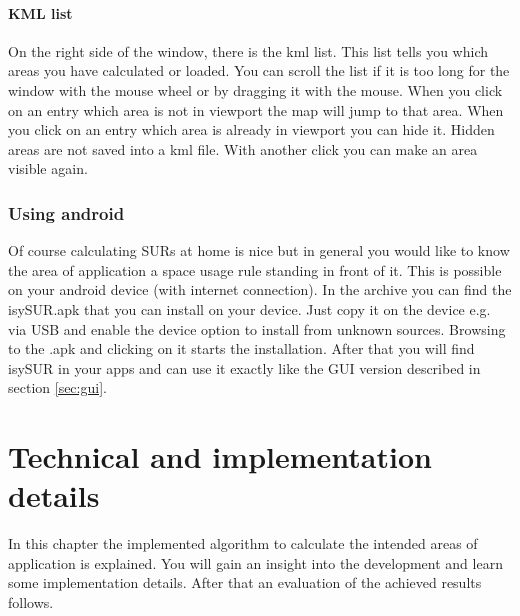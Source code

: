 \documentclass[11pt,fleqn]{book} %
\begin{document}
\subsubsection{KML list}
On the right side of the window, there is the kml list. This list tells you which areas you have calculated or loaded. You can scroll the list if it is too long for the window with the mouse wheel or by dragging it with the mouse. When you click on an entry which area is not in viewport the map will jump to that area. When you click on an entry which area is already in viewport you can hide it. Hidden areas are not saved into a kml file. With another click you can make an area visible again. %

\subsection{Using android}\label{sec:android}
Of course calculating SURs at home is nice but in general you would like to know the area of application a space usage rule standing in front of it. This is possible on your android device (with internet connection). In the archive you can find the isySUR.apk that you can install on your device. Just copy it on the device e.g. via USB and enable the device option to install from unknown sources. Browsing to the .apk and clicking on it starts the installation. After that you will find isySUR in your apps and can use it exactly like the GUI version described in section \ref{sec:gui}.


\chapter{Technical and implementation details}
In this chapter the implemented algorithm to calculate the intended areas of application is explained. You will gain an insight into the development and learn some implementation details. After that an evaluation of the achieved results follows.
\end{document}

